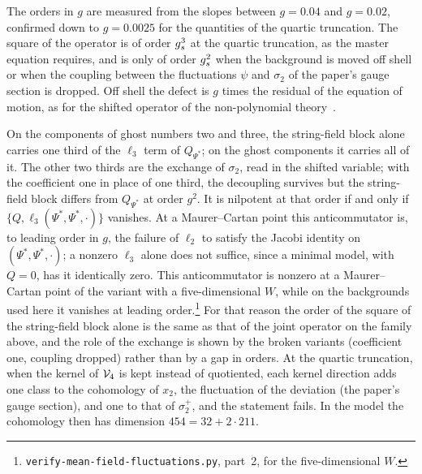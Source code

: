 The orders in $g$ are measured from the slopes between $g = 0.04$ and $g = 0.02$, confirmed down to $g = 0.0025$ for the quantities of the quartic truncation.
The square of the operator is of order $g_s^3$ at the quartic truncation, as the master equation requires, and is only of order $g_s^2$ when the background is moved off shell or when the coupling between the fluctuations $\psi$ and $\sigma_2$ of the paper's gauge section is dropped.
Off shell the defect is $g$ times the residual of the equation of motion, as for the shifted operator of the non-polynomial theory~\cite[eq.~(4.117)]{Zwiebach:1993:ClosedStringField}.

On the components of ghost numbers two and three, the string-field block alone carries one third of the $\ell_3$ term of $Q_{\Psi^*}$; on the ghost components it carries all of it.
The other two thirds are the exchange of $\sigma_2$, read in the shifted variable; with the coefficient one in place of one third, the decoupling survives but the string-field block differs from $Q_{\Psi^*}$ at order $g^2$.
It is nilpotent at that order if and only if $\{Q, \ell_3(\Psi^*, \Psi^*, \cdot)\}$ vanishes.
At a Maurer--Cartan point this anticommutator is, to leading order in $g$, the failure of $\ell_2$ to satisfy the Jacobi identity on $(\Psi^*, \Psi^*, \cdot)$; a nonzero $\ell_3$ alone does not suffice, since a minimal model, with $Q = 0$, has it identically zero.
This anticommutator is nonzero at a Maurer--Cartan point of the variant with a five-dimensional $W$, while on the backgrounds used here it vanishes at leading order.\footnote{\texttt{verify-mean-field-fluctuations.py}, part~2, for the five-dimensional $W$.}
For that reason the order of the square of the string-field block alone is the same as that of the joint operator on the family above, and the role of the exchange is shown by the broken variants (coefficient one, coupling dropped) rather than by a gap in orders.
At the quartic truncation, when the kernel of $\mathcal{V}_{4}$ is kept instead of quotiented, each kernel direction adds one class to the cohomology of $x_2$, the fluctuation of the deviation (the paper's gauge section), and one to that of $\sigma_2^+$, and the statement fails.
In the model the cohomology then has dimension $454 = 32 + 2 \cdot 211$.

